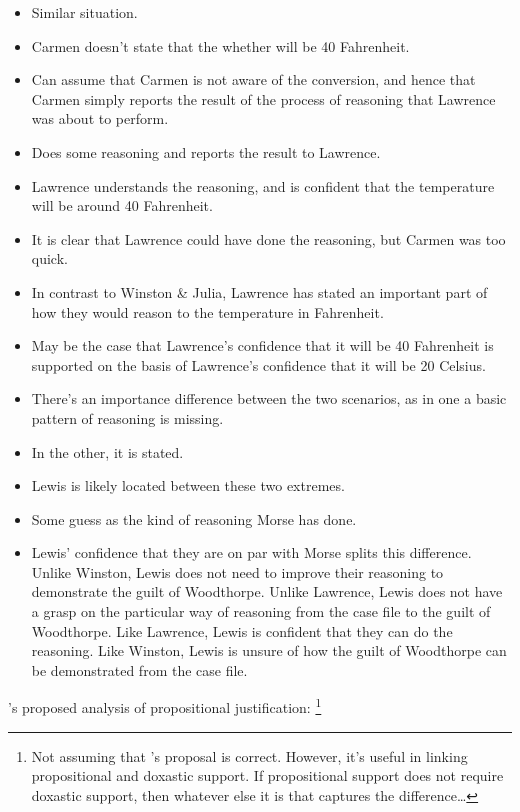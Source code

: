 \documentclass[10pt]{article}
\begin{document}
\begin{itemize}
\item Similar situation.
\item Carmen doesn't state that the whether will be 40 Fahrenheit.
\item Can assume that Carmen is not aware of the conversion, and hence that Carmen simply reports the result of the process of reasoning that Lawrence was about to perform.
\item Does some reasoning and reports the result to Lawrence.
\item Lawrence understands the reasoning, and is confident that the temperature will be around 40 Fahrenheit.
\item It is clear that Lawrence could have done the reasoning, but Carmen was too quick.
\item In contrast to Winston \& Julia, Lawrence has stated an important part of how they would reason to the temperature in Fahrenheit.
\item May be the case that Lawrence's confidence that it will be 40 Fahrenheit is supported on the basis of Lawrence's confidence that it will be 20 Celsius.
\end{itemize}

\begin{itemize}
\item There's an importance difference between the two scenarios, as in one a basic pattern of reasoning is missing.
\item In the other, it is stated.
\item Lewis is likely located between these two extremes.
\item Some guess as the kind of reasoning Morse has done.
\item Lewis' confidence that they are on par with Morse splits this difference.
  Unlike Winston, Lewis does not need to improve their reasoning to demonstrate the guilt of Woodthorpe.
  Unlike Lawrence, Lewis does not have a grasp on the particular way of reasoning from the case file to the guilt of Woodthorpe.
  Like Lawrence, Lewis is confident that they can do the reasoning.
  Like Winston, Lewis is unsure of how the guilt of Woodthorpe can be demonstrated from the case file.
\end{itemize}

\citeauthor{Turri:2010aa}'s proposed analysis of propositional justification:\nolinebreak
\footnote{Not assuming that \citeauthor{Turri:2010aa}'s proposal is correct.
  However, it's useful in linking propositional and doxastic support.
  If propositional support does not require doxastic support, then whatever else it is that captures the difference\dots
}
\end{document}

